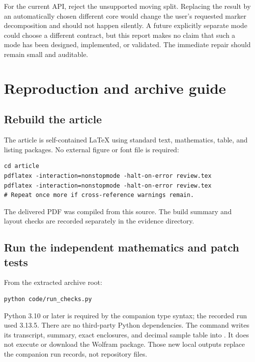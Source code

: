 \documentclass[11pt,letterpaper]{article}
\theoremstyle{remark}\newtheorem{remark}[theorem]{Remark}
\newcommand{\file}[1]{\path{#1}}
\begin{document}
For the current API, reject the unsupported moving split. Replacing the result
by an automatically chosen different core would change the user's requested
marker decomposition and should not happen silently. A future explicitly
separate mode could choose a different contract, but this report makes no claim
that such a mode has been designed, implemented, or validated. The immediate
repair should remain small and auditable.

\section{Reproduction and archive guide}
\subsection{Rebuild the article}
The article is self-contained LaTeX using standard text, mathematics, table,
and listing packages. No external figure or font file is required:
\begin{lstlisting}
cd article
pdflatex -interaction=nonstopmode -halt-on-error review.tex
pdflatex -interaction=nonstopmode -halt-on-error review.tex
# Repeat once more if cross-reference warnings remain.
\end{lstlisting}
The delivered PDF was compiled from this source. The build summary and layout
checks are recorded separately in the evidence directory.

\subsection{Run the independent mathematics and patch tests}
From the extracted archive root:
\begin{lstlisting}
python code/run_checks.py
\end{lstlisting}
Python 3.10 or later is required by the companion type syntax; the recorded run
used 3.13.5. There are no third-party Python dependencies. The command writes
its transcript, summary, exact enclosures, and decimal sample table into
\file{evidence/}. It does not execute or download the Wolfram package. Those
new local outputs replace the companion run records, not repository files.
\end{document}
